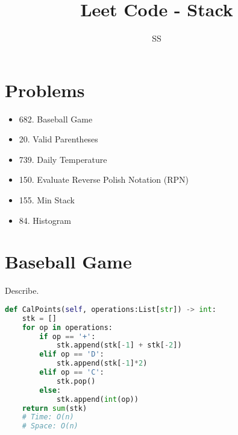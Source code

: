 \documentclass{article}
\title{Leet Code - Stack}
\author{SS}
\begin{document}
\maketitle

\section{Problems}
\begin{itemize}
    \item 682. Baseball Game
    \item 20. Valid Parentheses
    \item 739. Daily Temperature
    \item 150. Evaluate Reverse Polish Notation (RPN)
    \item 155. Min Stack
    \item 84. Histogram
\end{itemize}
\section{Baseball Game}
\begin{tcolorbox}[colback=red!5!white, colframe=red!50!black,title=682.Baseball Game ] 
Describe.
\end{tcolorbox}
\begin{lstlisting}[language=Python]
def CalPoints(self, operations:List[str]) -> int:
    stk = []
    for op in operations:
        if op == '+':
            stk.append(stk[-1] + stk[-2])
        elif op == 'D':
            stk.append(stk[-1]*2)
        elif op == 'C':
            stk.pop()
        else:
            stk.append(int(op))
    return sum(stk)
    # Time: O(n)
    # Space: O(n)

\end{lstlisting}
\end{document}
